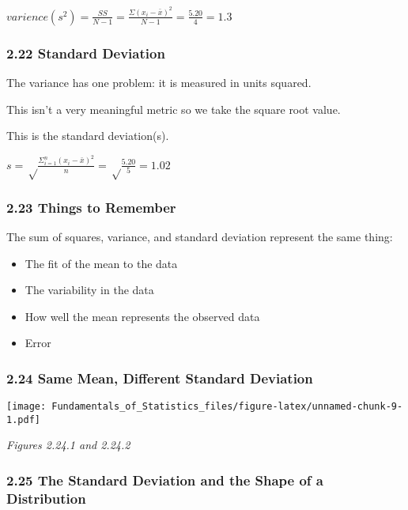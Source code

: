 \documentclass[]{article}
\providecommand{\tightlist}{%
  \setlength{\itemsep}{0pt}\setlength{\parskip}{0pt}}
\begin{document}
\(varience (s^2) = \frac{SS}{N-1} = \frac{\Sigma(x_i-\bar{x})^2}{N-1} = \frac{5.20}{4} = 1.3\)

\hypertarget{standard-deviation}{%
\subsubsection{2.22 Standard Deviation}\label{standard-deviation}}

The variance has one problem: it is measured in units squared.

This isn't a very meaningful metric so we take the square root value.

This is the standard deviation(s).

\(s = \sqrt\frac{\Sigma^n_{i=1}(x_i-\bar{x})^2}{n} = \sqrt\frac{5.20}{5} = 1.02\)

\hypertarget{things-to-remember}{%
\subsubsection{2.23 Things to Remember}\label{things-to-remember}}

The sum of squares, variance, and standard deviation represent the same
thing:

\begin{itemize}
\tightlist
\item
  The fit of the mean to the data
\item
  The variability in the data
\item
  How well the mean represents the observed data
\item
  Error
\end{itemize}

\hypertarget{same-mean-different-standard-deviation}{%
\subsubsection{2.24 Same Mean, Different Standard
Deviation}\label{same-mean-different-standard-deviation}}

\texttt{[image: Fundamentals\_of\_Statistics\_files/figure-latex/unnamed-chunk-9-1.pdf]}

\emph{Figures 2.24.1 and 2.24.2}

\hypertarget{the-standard-deviation-and-the-shape-of-a-distribution}{%
\subsubsection{2.25 The Standard Deviation and the Shape of a
Distribution}\label{the-standard-deviation-and-the-shape-of-a-distribution}}
\end{document}
